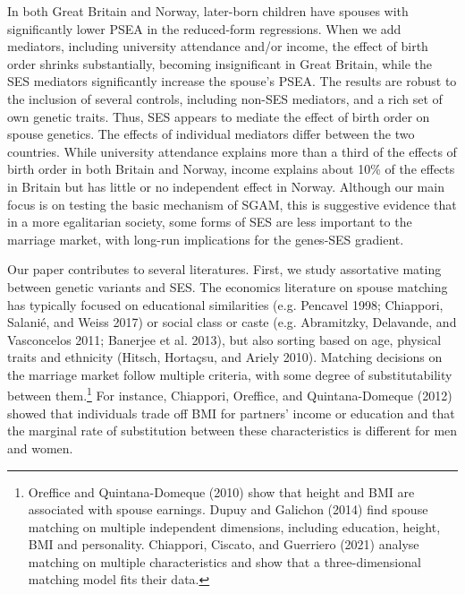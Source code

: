 \documentclass[
  12pt,
]{article}
\theoremstyle{definition}
\theoremstyle{definition}
\theoremstyle{definition}
\theoremstyle{definition}
\theoremstyle{remark}
\begin{document}
In both Great Britain and Norway, later-born children have spouses
with significantly lower PSEA in the reduced-form regressions. When we add
mediators, including university attendance and/or income, the effect of birth
order shrinks substantially, becoming insignificant in Great Britain, while the
SES mediators significantly increase the spouse's PSEA. The results are
robust to the inclusion of several controls, including non-SES mediators, and a
rich set of own genetic traits. Thus, SES appears to mediate the effect of birth
order on spouse genetics. The effects of individual mediators differ between the
two countries. While university attendance explains more than a third of the
effects of birth order in both Britain and Norway, income explains about 10\% of
the effects in Britain but has little or no independent effect in Norway.
Although our main focus is on testing the basic mechanism of SGAM, this is
suggestive evidence that in a more egalitarian society, some forms of SES are
less important to the marriage market, with long-run implications for the
genes-SES gradient.

Our paper contributes to several literatures. First, we study assortative mating
between genetic variants and SES. The economics literature on spouse matching
has typically focused on educational similarities (e.g. Pencavel 1998; Chiappori, Salanié, and Weiss 2017) or social class or caste (e.g. Abramitzky, Delavande, and Vasconcelos 2011; Banerjee et al. 2013), but also sorting based on age,
physical traits and ethnicity (Hitsch, Hortaçsu, and Ariely 2010). Matching decisions on the
marriage market follow multiple criteria, with some degree of substitutability
between them.\footnote{Oreffice and Quintana-Domeque (2010) show that height and BMI are associated
  with spouse earnings. Dupuy and Galichon (2014) find spouse matching on multiple
  independent dimensions, including education, height, BMI and personality.
  Chiappori, Ciscato, and Guerriero (2021) analyse matching on multiple characteristics
  and show that a three-dimensional matching model fits their data.} For instance, Chiappori, Oreffice, and Quintana-Domeque (2012) showed that
individuals trade off BMI for partners' income or education and that the
marginal rate of substitution between these characteristics is different for men
and women.
\end{document}
